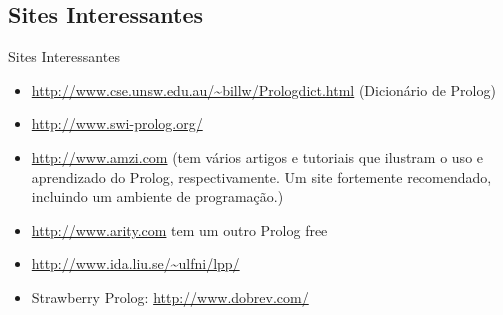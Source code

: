 \documentclass[sans]{beamer}
\begin{document}
\subsection{Sites Interessantes}
\begin{frame}
\begin{block}{Sites Interessantes}
\begin{itemize}

\item  \url{http://www.cse.unsw.edu.au/~billw/Prologdict.html} (Dicionário de Prolog)
\item  \url{http://www.swi-prolog.org/}
\item  \url{http://www.amzi.com} (tem vários artigos e tutoriais
  que ilustram o uso e aprendizado do Prolog, respectivamente. Um site fortemente recomendado, incluindo  um ambiente de programação.)
\item  \url{http://www.arity.com} tem um outro Prolog free
\item  \url{http://www.ida.liu.se/~ulfni/lpp/}
\item  Strawberry Prolog:  \url{http://www.dobrev.com/}

\end{itemize}
\end{block}
\end{frame}

\end{document}
